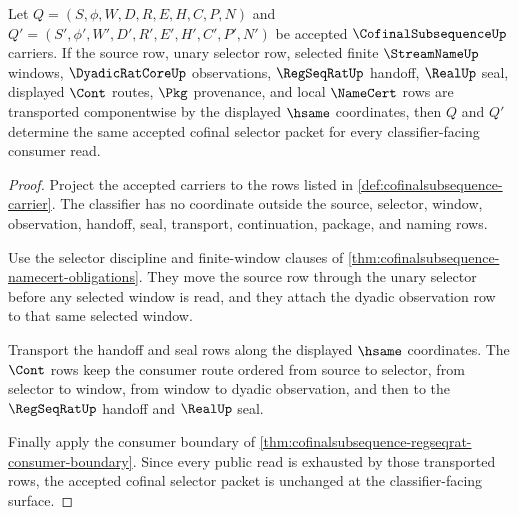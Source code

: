 \begin{theorem}
\label{thm:cofinalsubsequence-selector-transport-exactness}
Let $Q=(S,\phi,W,D,R,E,H,C,P,N)$ and $Q'=(S',\phi',W',D',R',E',H',C',P',N')$ be accepted $\CofinalSubsequenceUp$ carriers. If the source row, unary selector row, selected finite $\StreamNameUp$ windows, $\DyadicRatCoreUp$ observations, $\RegSeqRatUp$ handoff, $\RealUp$ seal, displayed $\Cont$ routes, $\Pkg$ provenance, and local $\NameCert$ rows are transported componentwise by the displayed $\hsame$ coordinates, then $Q$ and $Q'$ determine the same accepted cofinal selector packet for every classifier-facing consumer read.
\end{theorem}
\begin{proof}
Project the accepted carriers to the rows listed in \autoref{def:cofinalsubsequence-carrier}. The classifier has no coordinate outside the source, selector, window, observation, handoff, seal, transport, continuation, package, and naming rows.

Use the selector discipline and finite-window clauses of \autoref{thm:cofinalsubsequence-namecert-obligations}. They move the source row through the unary selector before any selected window is read, and they attach the dyadic observation row to that same selected window.

Transport the handoff and seal rows along the displayed $\hsame$ coordinates. The $\Cont$ rows keep the consumer route ordered from source to selector, from selector to window, from window to dyadic observation, and then to the $\RegSeqRatUp$ handoff and $\RealUp$ seal.

Finally apply the consumer boundary of \autoref{thm:cofinalsubsequence-regseqrat-consumer-boundary}. Since every public read is exhausted by those transported rows, the accepted cofinal selector packet is unchanged at the classifier-facing surface.
\end{proof}

